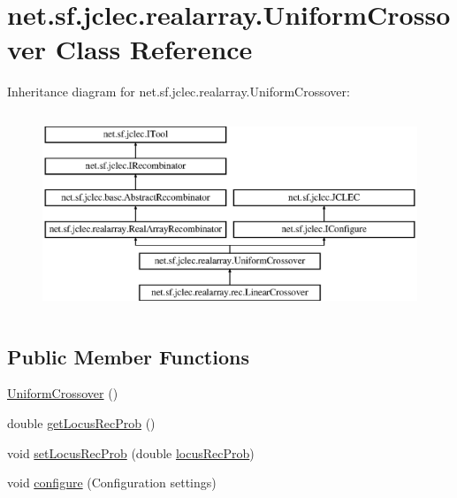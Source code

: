 \hypertarget{classnet_1_1sf_1_1jclec_1_1realarray_1_1_uniform_crossover}{\section{net.\-sf.\-jclec.\-realarray.\-Uniform\-Crossover Class Reference}
\label{classnet_1_1sf_1_1jclec_1_1realarray_1_1_uniform_crossover}
}
Inheritance diagram for net.\-sf.\-jclec.\-realarray.\-Uniform\-Crossover\-:\begin{figure}[H]
\begin{center}
\leavevmode
\includegraphics[height=6.000000cm]{classnet_1_1sf_1_1jclec_1_1realarray_1_1_uniform_crossover}
\end{center}
\end{figure}
\subsection*{Public Member Functions}
\begin{DoxyCompactItemize}
\item 
\hyperlink{classnet_1_1sf_1_1jclec_1_1realarray_1_1_uniform_crossover_afb4c7022834ed19c05cbc71752ff4e96}{Uniform\-Crossover} ()
\item 
double \hyperlink{classnet_1_1sf_1_1jclec_1_1realarray_1_1_uniform_crossover_ad136c456181a016fe9ba1160af98f7ee}{get\-Locus\-Rec\-Prob} ()
\item 
void \hyperlink{classnet_1_1sf_1_1jclec_1_1realarray_1_1_uniform_crossover_a94d944e8bc548eca6f49b3d0b7059af1}{set\-Locus\-Rec\-Prob} (double \hyperlink{classnet_1_1sf_1_1jclec_1_1realarray_1_1_uniform_crossover_ac9dc2c22053a7568c07573bf20b68c4a}{locus\-Rec\-Prob})
\item 
void \hyperlink{classnet_1_1sf_1_1jclec_1_1realarray_1_1_uniform_crossover_a8daa3f5542a370213ada13769c7abd28}{configure} (Configuration settings)
\end{DoxyCompactItemize}

